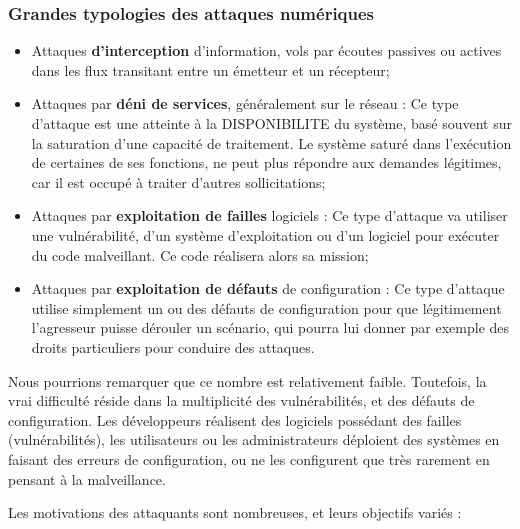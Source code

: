 \begin{frame}
\frametitle<presentation>{Grandes typologies des attaques numériques}
\begin{itemize}
\item Attaques \textbf{d’interception} d’information, vols par écoutes passives ou actives dans les flux transitant entre un émetteur et un récepteur;
\item Attaques par \textbf{déni de services}, généralement sur le réseau : Ce type d’attaque est une atteinte à la DISPONIBILITE du système, basé souvent sur la saturation d’une capacité de traitement. Le système saturé dans l’exécution de certaines de ses fonctions, ne peut plus répondre aux demandes légitimes, car il est occupé à traiter d’autres sollicitations;
\item Attaques par \textbf{exploitation de failles }logiciels : Ce type d’attaque va utiliser une vulnérabilité, d’un système d’exploitation ou d’un logiciel pour exécuter du code malveillant. Ce code réalisera alors sa mission;
\item Attaques par \textbf{exploitation de défauts} de configuration : Ce type d’attaque utilise simplement un ou des défauts de configuration pour que légitimement l’agresseur puisse dérouler un scénario, qui pourra lui donner par exemple des droits particuliers pour conduire des attaques.
\end{itemize}
\end{frame}

Nous pourrions remarquer que ce nombre est relativement faible. Toutefois, la vrai difficulté réside dans la multiplicité des vulnérabilités, et des défauts de configuration. Les développeurs réalisent des logiciels possédant des failles (vulnérabilités), les utilisateurs ou les administrateurs déploient des systèmes en faisant des erreurs de configuration, ou ne les configurent que très rarement en pensant à la malveillance.

Les motivations des attaquants sont nombreuses, et leurs objectifs variés :

